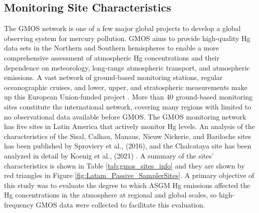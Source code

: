 \subsection{Monitoring Site Characteristics}
\begin{flushleft}
 The GMOS network is one of a few major global projects to develop a global observing system for mercury pollution. GMOS aims to provide high-quality Hg data sets in the Northern and Southern hemispheres to enable a more comprehensive assessment of atmospheric Hg concentrations and their dependence on meteorology, long-range atmospheric transport, and atmospheric emissions\cite{sprovieri_atmospheric_2016}. A vast network of ground-based monitoring stations, regular oceanographic cruises, and lower, upper, and stratospheric measurements make up this European Union-funded project \cite{koenig_seasonal_2021,sprovieri_atmospheric_2016}. More than 40 ground-based monitoring sites constitute the international network, covering many regions with limited to no observational data available before GMOS\cite{sprovieri_atmospheric_2016}. The GMOS monitoring network has five sites in Latin America that actively monitor Hg levels. An analysis of the characteristics of the Sisal, Calhau, Manaus, Nieuw Nickerie, and Bariloche sites has been published by Sproviery et al., (2016), and the Chalcataya site has been analyzed in detail by Koenig et al., (2021) \cite{koenig_seasonal_2021,sprovieri_atmospheric_2016}. A summary of the sites' characteristics is shown in Table \ref{tab:gmos_sites_info}  and they are shown by red triangles in Figure \ref{fig:Latam_Passive_SamplerSites}. A primary objective of this study was to evaluate the degree to which ASGM Hg emissions affected the Hg concentrations in the atmosphere at regional and global scales, so high-frequency GMOS data were collected to facilitate this evaluation.
  \end{flushleft}
  
